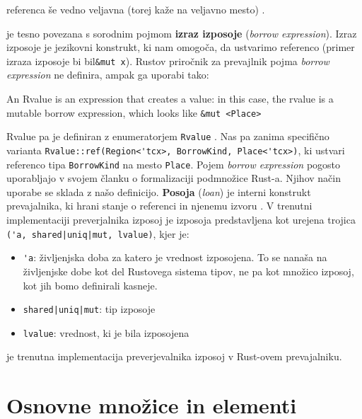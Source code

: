 \documentclass[a4paper,12pt,openright]{book}
\begin{document}
\begin{description}
	      referenca še vedno veljavna (torej kaže na veljavno mesto) \cite{klabnikRustProgrammingLanguage2023}.
	\item[Posoja (\textit{loan})] je tesno povezana s sorodnim pojmom \textbf{izraz izposoje} (\textit{borrow expression}). Izraz izposoje
	      je jezikovni konstrukt, ki nam omogoča, da ustvarimo referenco (primer izraza izposoje bi bil\verb|&mut x|).
	      Rustov priročnik za prevajlnik \cite{MIRMidlevelIR} pojma \textit{borrow expression} ne definira, ampak ga uporabi tako:
	      \begin{displayquote}
		      An Rvalue is an expression that creates a value: in this case, the rvalue is a
		      mutable borrow expression, which looks like \verb|&mut <Place>|
	      \end{displayquote}
	      Rvalue pa je definiran z enumeratorjem \verb|Rvalue| \cite{RvalueRustc_middleMira}. Nas pa zanima specifično
	      varianta \verb|Rvalue::ref(Region<'tcx>, BorrowKind, Place<'tcx>)|, ki ustvari referenco tipa \verb|BorrowKind|
	      na mesto \verb|Place|.
	      Pojem \textit{borrow expression} pogosto uporabljajo \citeauthor{weissOxideEssenceRust2019} v svojem članku o formalizaciji
	      podmnožice Rust-a. Njihov način uporabe se sklada z našo definicijo.
	      \textbf{Posoja} (\textit{loan}) je interni konstrukt prevajalnika, ki hrani stanje o referenci in njenemu izvoru
	      \cite{weissOxideEssenceRust2019}. V trenutni implementaciji preverjalnika izposoj je izposoja predstavljena kot
	      urejena trojica \cite{2094nllRustRFC} \verb=('a, shared|uniq|mut, lvalue)=, kjer je:
	      \begin{itemize}
		      \item \verb|'a|: življenjska doba za katero je vrednost izposojena. To se nanaša na življenjske dobe kot
		            del Rustovega sistema tipov, ne pa kot množico izposoj, kot jih bomo definirali kasneje.
		      \item \verb=shared|uniq|mut=: tip izposoje
		      \item \verb|lvalue|: vrednost, ki je bila izposojena
	      \end{itemize}
	\item[NLL] je trenutna implementacija preverjevalnika izposoj v Rust-ovem prevajalniku.
\end{description}

\section{Osnovne množice in elementi}
\end{document}
